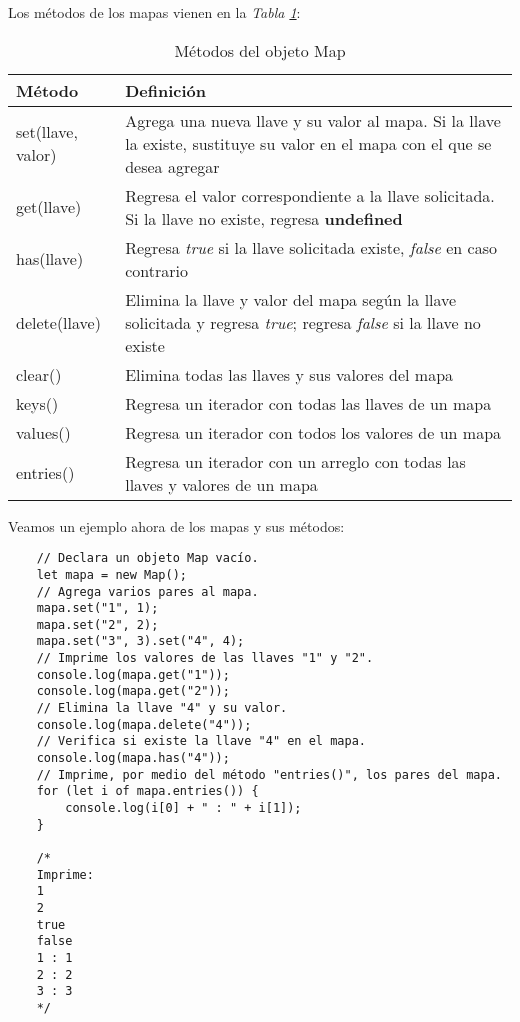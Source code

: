 Los métodos de los mapas vienen en la \textit{Tabla \ref{tab: 12}}:
\begin{table}[H]
    \begin{center}
        \caption{Métodos del objeto Map}
        \label{tab: 12}
        \begin{tabular}{m{3cm} m{10cm}}
            \hline
            \textbf{Método} & \textbf{Definición} \\
            \hline
            set(llave, valor)   & Agrega una nueva llave y su valor al mapa. Si la llave la existe, sustituye su valor en el mapa con el que se desea agregar \\
            get(llave)          & Regresa el valor correspondiente a la llave solicitada. Si la llave no existe, regresa \textbf{undefined} \\
            has(llave)          & Regresa \textit{true} si la llave solicitada existe, \textit{false} en caso contrario \\
            delete(llave)      & Elimina la llave y valor del mapa según la llave solicitada y regresa \textit{true}; regresa \textit{false} si la llave no existe \\
            clear()             & Elimina todas las llaves y sus valores del mapa \\
            keys()              & Regresa un iterador con todas las llaves de un mapa \\
            values()            & Regresa un iterador con todos los valores de un mapa \\
            entries()           & Regresa un iterador con un arreglo con todas las llaves y valores de un mapa \\
            \hline
        \end{tabular}
    \end{center}    
\end{table}

Veamos un ejemplo ahora de los mapas y sus métodos:
\begin{lstlisting}
    // Declara un objeto Map vacío.
    let mapa = new Map();
    // Agrega varios pares al mapa.
    mapa.set("1", 1);
    mapa.set("2", 2);
    mapa.set("3", 3).set("4", 4);
    // Imprime los valores de las llaves "1" y "2".
    console.log(mapa.get("1"));
    console.log(mapa.get("2"));
    // Elimina la llave "4" y su valor.
    console.log(mapa.delete("4"));
    // Verifica si existe la llave "4" en el mapa.
    console.log(mapa.has("4"));
    // Imprime, por medio del método "entries()", los pares del mapa.
    for (let i of mapa.entries()) {
        console.log(i[0] + " : " + i[1]);
    }

    /*
    Imprime:
    1
    2
    true
    false
    1 : 1
    2 : 2
    3 : 3
    */
\end{lstlisting}

